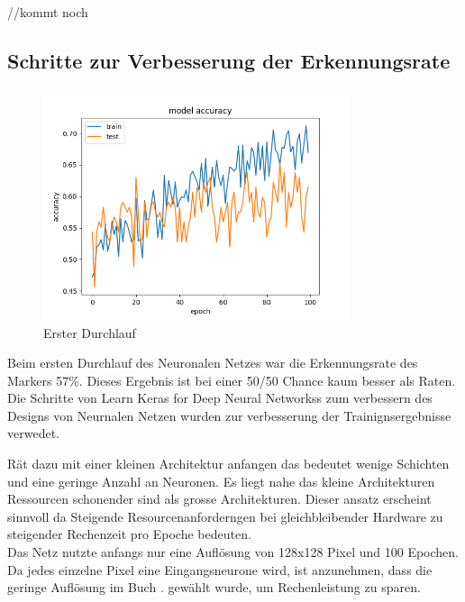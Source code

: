 \documentclass[conference]{IEEEtran}
\begin{document}
	//kommt noch
	\subsection{Schritte zur Verbesserung der Erkennungsrate} %

	\begin{figure}[!h]
		\centering
		\includegraphics[width=9cm]{img/160x120:100@32_accuracy.png}
		\caption{Erster Durchlauf}
		\label{Initiales Ergebnis}
	\end{figure}
	Beim ersten Durchlauf des Neuronalen Netzes war die Erkennungsrate des Markers 57\%. Dieses Ergebnis ist bei einer 50/50 Chance kaum besser als Raten.\\
	
	Die Schritte von  \glqq Learn Keras for Deep Neural Networkss\grqq \cite{moolayil2019learn} zum verbessern des Designs von Neurnalen Netzen wurden zur verbesserung der Trainignsergebnisse verwedet. 
	
	\cite{moolayil2019learn} Rät dazu mit einer kleinen Architektur anfangen 
	das bedeutet wenige Schichten und eine geringe Anzahl an Neuronen. Es 
	liegt nahe das kleine Architekturen Ressourcen schonender sind als 
	grosse Architekturen. Dieser ansatz erscheint sinnvoll da Steigende 
	Resourcenanforderngen bei gleichbleibender Hardware zu steigender 
	Rechenzeit pro Epoche bedeuten. \\
	
	Das Netz nutzte anfangs nur eine Auflösung von 128x128 Pixel und 100 
	Epochen. Da jedes einzelne Pixel eine Eingangsneurone wird, ist 
	anzunehmen, dass die geringe Auflösung im Buch 
	\cite{govers2018artificial}.  gewählt wurde, um Rechenleistung zu 
	sparen. \\
	
\end{document}
